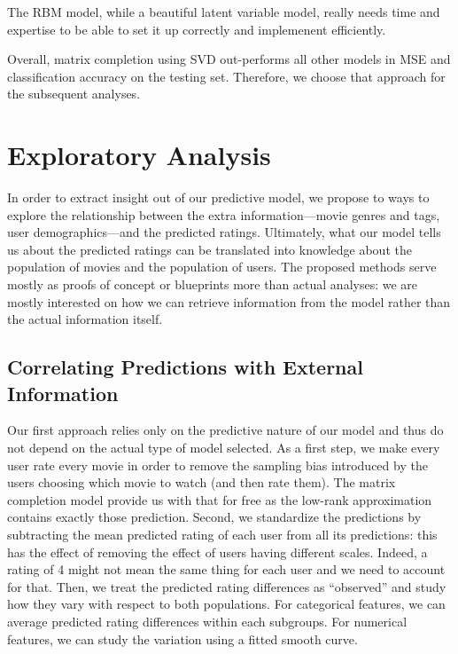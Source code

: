 \documentclass[bj, preprint]{imsart}
\begin{document}
The RBM model, while a beautiful latent variable model, really needs time and expertise to be able to set it up correctly and implemenent efficiently.  

Overall, matrix completion using SVD out-performs all other models in MSE and classification accuracy on the testing set. Therefore, we choose that approach for the subsequent analyses.




\section{Exploratory Analysis}\label{sec:explore}

In order to extract insight out of our predictive model, we propose to ways to explore the relationship between the extra information---movie genres and tags, user demographics---and the predicted ratings. Ultimately, what our model tells us about the predicted ratings can be translated into knowledge about the population of movies and the population of users. The proposed methods serve mostly as proofs of concept or blueprints more than actual analyses: we are mostly interested on how we can retrieve information from the model rather than the actual information itself.

\subsection{Correlating Predictions with External Information}\label{subsec:explore.corr}

Our first approach relies only on the predictive nature of our model and thus do not depend on the actual type of model selected. As a first step, we make every user rate every movie in order to remove the sampling bias introduced by the users choosing which movie to watch (and then rate them). The matrix completion model provide us with that for free as the low-rank approximation contains exactly those prediction. Second, we standardize the predictions by subtracting the mean predicted rating of each user from all its predictions: this has the effect of removing the effect of users having different scales. Indeed, a rating of 4 might not mean the same thing for each user and we need to account for that. Then, we treat the predicted rating differences as ``observed'' and study how they vary with respect to both populations. For categorical features, we can average predicted rating differences within each subgroups. For numerical features, we can study the variation using a fitted smooth curve.
\end{document}
